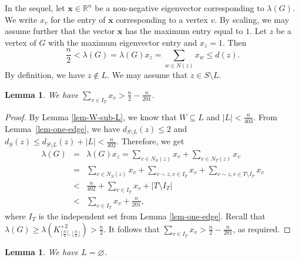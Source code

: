 \documentclass[11pt]{article}
\newtheorem{lemma}[theorem]{Lemma}
\begin{document}
In the sequel, let $\mathbf{x}\in \mathbb{R}^n$ 
be a non-negative eigenvector corresponding to $\lambda (G)$. 
We write ${x}_v$ for the entry of $\mathbf{x}$ 
corresponding to a vertex $v$. 
By scaling, we may assume further  that the vector $\mathbf{x}$  has 
the maximum entry equal to $1$. 
Let $z$ be a vertex of $G$ with the maximum eigenvector entry and ${x}_z=1$. Then 
 $$ 
 \frac{n}{2} < 
 \lambda (G) = \lambda (G) {x}_z = 
 \sum_{w\in N( z)}  {x}_w \le d(z).$$
 By definition, we have $z\notin L$. 
We may assume that $z\in S\setminus L$.

\begin{lemma} \label{lem-IT}
We have $ \sum\limits_{ v\in I_T}  {x}_v >  \frac{n}{2} - \frac{n}{201}$.
\end{lemma}

\begin{proof} 
  By Lemma \ref{lem-W-sub-L}, we know that $W\subseteq L$ and 
  $|L|< \frac{n}{403}$. 
From Lemma~\ref{lem-one-edge}, we have 
$d_{S\setminus L}(z) \le 2$ and 
 $  d_S(z)\le d_{S\setminus L}(z) + |L| < \frac{n}{402}$.  
 Therefore, we get
 \begin{eqnarray*}
 \lambda (G)&=& \lambda (G) {x}_z  = 
 \sum_{v\in N_S(z)} {x}_v 
 +\sum_{v\in N_T(z)} {x}_v\\
 &=& \sum_{v\in N_S(z)} {x}_v+  \sum_{v\sim z, v\in I_T} {x}_v+\sum_{v\sim z , v\in T\setminus I_T} {x}_v\\  
 &<&  \frac{n}{402} +\sum_{ v\in I_T} {x}_v+ |T \setminus I_T|\\ 
&<&  \sum_{ v\in I_T} {x}_v  + \frac{n}{201}, 
\end{eqnarray*}
where $I_T$ is the independent set from Lemma \ref{lem-one-edge}. Recall that $\lambda (G) \ge 
\lambda (K_{\lceil \frac{n}{2} \rceil, \lfloor \frac{n}{2} \rfloor}^{+2})  > \frac{n}{2}$. 
 It follows that 
$ \sum_{ v\in I_T} {x}_v> \frac{n}{2} - \frac{n}{201}$, as required.
\end{proof}


\begin{lemma}\label{Lempty}
 We have $L = \varnothing$. 
\end{lemma}
\end{document}
